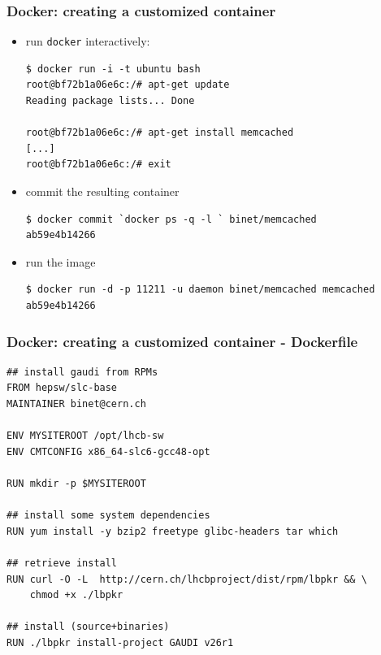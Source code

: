 \documentclass[9pt]{beamer}
\begin{document}
\begin{frame}[fragile]
  \frametitle{Docker: creating a customized container}
\begin{block}{}
\begin{itemize}
  \item run \texttt{docker} interactively:
\begin{verbatim}
$ docker run -i -t ubuntu bash
root@bf72b1a06e6c:/# apt-get update
Reading package lists... Done

root@bf72b1a06e6c:/# apt-get install memcached
[...]
root@bf72b1a06e6c:/# exit
\end{verbatim}

  \item commit the resulting container
\begin{verbatim}
$ docker commit `docker ps -q -l ` binet/memcached
ab59e4b14266
\end{verbatim}

  \item run the image
\begin{verbatim}
$ docker run -d -p 11211 -u daemon binet/memcached memcached
ab59e4b14266
\end{verbatim}
\end{itemize}
\end{block}
\end{frame}

\begin{frame}[fragile]
  \frametitle{Docker: creating a customized container - Dockerfile}
\begin{block}{}
\begin{verbatim}
## install gaudi from RPMs
FROM hepsw/slc-base
MAINTAINER binet@cern.ch

ENV MYSITEROOT /opt/lhcb-sw
ENV CMTCONFIG x86_64-slc6-gcc48-opt

RUN mkdir -p $MYSITEROOT

## install some system dependencies
RUN yum install -y bzip2 freetype glibc-headers tar which

## retrieve install
RUN curl -O -L  http://cern.ch/lhcbproject/dist/rpm/lbpkr && \
    chmod +x ./lbpkr

## install (source+binaries)
RUN ./lbpkr install-project GAUDI v26r1
\end{verbatim}

\end{block}
\end{frame}
\end{document}

